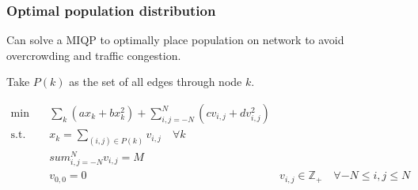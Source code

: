\documentclass[11pt]{beamer}
\begin{document}
\begin{frame}
\frametitle{Optimal population distribution}

Can solve a MIQP to optimally place population on network to avoid overcrowding and traffic congestion.

Take $P(k)$ as the set of all edges through node $k$.

\begin{align*}
	\min\quad& \sum_{k} \left(ax_k + bx_k^2\right) + \sum_{i,j=-N}^N \left(c v_{i,j} + d v_{i,j}^2\right) \\
	\text{s.t.}\quad& x_k = \sum_{(i,j) \in P(k)} v_{i,j} \quad \forall k \\
	& sum_{i,j = -N}^N v_{i,j} = M \\
	& v_{0,0} = 0 \
	& v_{i,j} \in \mathbb{Z}_+ \quad \forall -N \leq i,j \leq N
\end{align*}

\end{frame}
\end{document}
